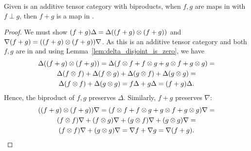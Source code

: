 \begin{lemma}\label{lem:biproduct-is-in-cfrob-x}
  Given \X is an additive tensor category with biproducts, when $f,g$ are maps in \CFrob with
  $f\perp g$, then $f+g$ is a map in \CFrob.
\end{lemma}
\begin{proof}
  We must show $(f+g)\Delta = \Delta((f+g)\otimes(f+g))$ and $\nabla(f+g) = ((f+g)\otimes(f+g))\nabla$. As
  this is an additive tensor category and both $f,g$ are in \CFrob and using
  Lemma~\ref{lem:delta_disjoint_is_zero}, we have
  \begin{multline*}
    \Delta((f+g)\otimes(f+g)) = \Delta( f\otimes f + f\otimes g + g\otimes f + g\otimes g) = \\
    \Delta(f\otimes f) + \Delta(f\otimes g) + \Delta(g\otimes f) + \Delta(g\otimes g) = \\
    \Delta(f\otimes f) + \Delta(g\otimes g) = f\Delta + g \Delta = (f+g)\Delta.
  \end{multline*}
  Hence, the biproduct of $f,g$ preserves $\Delta$.
  Similarly, $f+g$ preserves $\nabla$:
  \begin{multline*}
    ((f+g)\otimes(f+g))\nabla =( f\otimes f + f\otimes g + g\otimes f + g\otimes g)\nabla = \\
    (f\otimes f)\nabla +(f\otimes g) \nabla+(g\otimes f)\nabla + (g\otimes g)\nabla = \\
    (f\otimes f)\nabla + (g\otimes g)\nabla =\nabla f + \nabla g  = \nabla(f+g).
  \end{multline*}
\end{proof}

